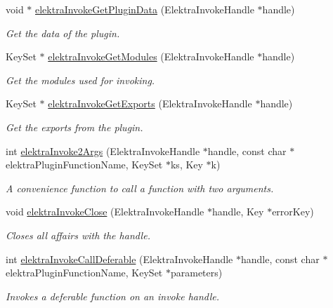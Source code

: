 \begin{DoxyCompactItemize}
void $\ast$ \mbox{\hyperlink{group__invoke_gac615e211a4d3c77addfa18152c274345}{elektra\+Invoke\+Get\+Plugin\+Data}} (Elektra\+Invoke\+Handle $\ast$handle)
\begin{DoxyCompactList}\small\item\em Get the data of the plugin. \end{DoxyCompactList}\item 
Key\+Set $\ast$ \mbox{\hyperlink{group__invoke_gaf3564011b52e96c9754a7b9bc41ea478}{elektra\+Invoke\+Get\+Modules}} (Elektra\+Invoke\+Handle $\ast$handle)
\begin{DoxyCompactList}\small\item\em Get the modules used for invoking. \end{DoxyCompactList}\item 
Key\+Set $\ast$ \mbox{\hyperlink{group__invoke_ga6ab386aba337d8d3fd7978070d613efe}{elektra\+Invoke\+Get\+Exports}} (Elektra\+Invoke\+Handle $\ast$handle)
\begin{DoxyCompactList}\small\item\em Get the exports from the plugin. \end{DoxyCompactList}\item 
int \mbox{\hyperlink{group__invoke_gaa257d93399c60f73c611205bbfa7c9a0}{elektra\+Invoke2\+Args}} (Elektra\+Invoke\+Handle $\ast$handle, const char $\ast$elektra\+Plugin\+Function\+Name, Key\+Set $\ast$ks, Key $\ast$k)
\begin{DoxyCompactList}\small\item\em A convenience function to call a function with two arguments. \end{DoxyCompactList}\item 
void \mbox{\hyperlink{group__invoke_ga684a21daa0b3c20783c55184a9157b3b}{elektra\+Invoke\+Close}} (Elektra\+Invoke\+Handle $\ast$handle, Key $\ast$error\+Key)
\begin{DoxyCompactList}\small\item\em Closes all affairs with the handle. \end{DoxyCompactList}\item 
int \mbox{\hyperlink{group__invoke_ga0c1fe2bab1f3a465106d6585363787a1}{elektra\+Invoke\+Call\+Deferable}} (Elektra\+Invoke\+Handle $\ast$handle, const char $\ast$elektra\+Plugin\+Function\+Name, Key\+Set $\ast$parameters)
\begin{DoxyCompactList}\small\item\em Invokes a deferable function on an invoke handle. \end{DoxyCompactList}\item 

\end{DoxyCompactItemize}
